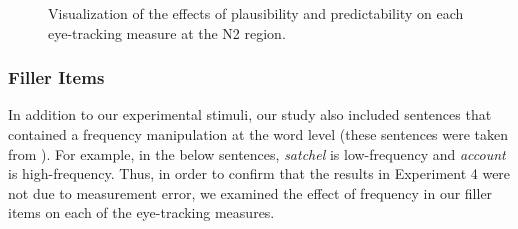 \documentclass[
  12pt,
  letterpaper,
]{scrreport}
\begin{document}
\begin{figure}[htbp]

\caption{\label{fig-fullmodelresultsn2}Visualization of the effects of
plausibility and predictability on each eye-tracking measure at the N2
region.}


\end{figure}%

\subsubsection{Filler Items}\label{filler-items}

In addition to our experimental stimuli, our study also included
sentences that contained a frequency manipulation at the word level
(these sentences were taken from
). For example, in the below sentences, \emph{satchel} is
low-frequency and \emph{account} is high-frequency. Thus, in order to
confirm that the results in Experiment 4 were not due to measurement
error, we examined the effect of frequency in our filler items on each
of the eye-tracking measures.
\end{document}

